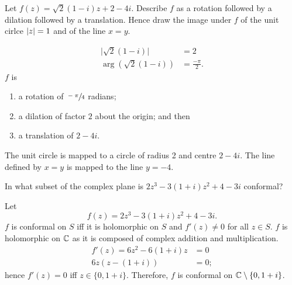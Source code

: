 
\setcounter{question}{1}
\question Let $f(z) = \sqrt 2(1 - i) z + 2 - 4i$. Describe $f$ as a rotation followed by a dilation followed by a translation. Hence draw the image under $f$ of the unit cirlce $\left\lvert z\right\rvert = 1$ and of the line $x = y$.
\begin{solution}
    \begin{align*}
        \lvert \sqrt2(1-i)\rvert &= 2 \\
        \arg(\sqrt2(1-i)) &= \frac{-\pi}2.
    \end{align*}
    $f$ is
    \begin{enumerate}
        \item a rotation of $\sfrac{-\pi}4$ radians;
        \item a dilation of factor $2$ about the origin; and then
        \item a translation of $2 - 4i$.
    \end{enumerate}
    The unit circle is mapped to a circle of radius 2 and centre $2 - 4i$.
    The line defined by $x = y$ is mapped to the line $y = -4$.
\end{solution}

\setcounter{question}{4}
\question In what subset of the complex plane is $2z^3 - 3(1 + i)z^2 + 4 - 3i$ conformal?
\begin{solution}
    Let
    \[ f(z) = 2z^3 - 3(1 + i)z^2 + 4 - 3i. \]
    $f$ is conformal on $S$ iff it is holomorphic on $S$ and 
    $f'(z) \neq 0$ for all $z \in S$.
    $f$ is holomorphic on $\mathbb{C}$ as it is composed of complex addition and multiplication.
    \begin{align*}
        f'(z) = 6z^2 - 6(1 + i)z &= 0 \\
        6z(z - (1+i))            &= 0;
    \end{align*}
    hence $f'(z) = 0$ iff $z \in \{0, 1+i\}$.
    Therefore, $f$ is conformal on $\mathbb{C} \setminus \{0, 1+i\}$.
\end{solution}

